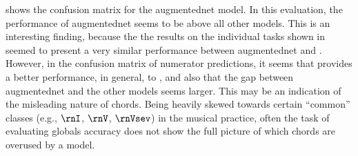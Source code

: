 

 shows the
confusion matrix for the \gls{augmentednet} model. In this
evaluation, the performance of \gls{augmentednet} seems to
be above all other models. This is an interesting finding,
because the the results on the individual tasks shown in
 seemed to present a very similar
performance between \gls{augmentednet} and
\textcite{micchi2021deep}. However, in the confusion matrix
of numerator predictions, it seems that
\textcite{mcleod2021modular} provides a better performance,
in general, to \textcite{micchi2021deep}, and also that the
gap between \gls{augmentednet} and the other models seems
larger. This may be an indication of the misleading nature
of chords. Being heavily skewed towards certain ``common''
classes (e.g., $\rnI$, $\rnV$, $\rnVsev$) in the musical
practice, often the task of evaluating globals accuracy does
not show the full picture of which chords are overused by a
model. 

